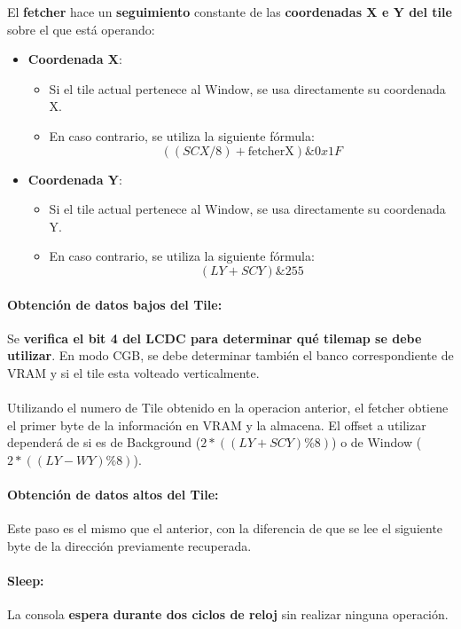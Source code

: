 El \textbf{fetcher} hace un \textbf{seguimiento} constante de las \textbf{coordenadas X e Y del tile} sobre el que está operando:

\begin{itemize}
    \item \textbf{Coordenada X}:
    \begin{itemize}
        \item Si el tile actual pertenece al Window, se usa directamente su coordenada X.
        \item En caso contrario, se utiliza la siguiente fórmula:
        \[
            ((SCX / 8) + \text{fetcherX}) \& 0x1F
        \]
    \end{itemize}
    \item \textbf{Coordenada Y}:
    \begin{itemize}
        \item Si el tile actual pertenece al Window, se usa directamente su coordenada Y.
        \item En caso contrario, se utiliza la siguiente fórmula:
        \[
            (LY + SCY) \& 255
        \]
    \end{itemize}
\end{itemize}

\paragraph{Obtención de datos bajos del Tile:} Se \textbf{verifica el bit 4 del LCDC para determinar qué tilemap se debe utilizar}. En modo CGB, se debe determinar también el banco correspondiente de VRAM y si el tile esta volteado verticalmente.
\\\\
Utilizando el numero de Tile obtenido en la operacion anterior, el fetcher obtiene el primer byte de la información en VRAM y la almacena. El offset a utilizar dependerá de si es de Background ($2*((LY + SCY) \% 8)$) o de Window ($2*((LY - WY) \% 8)$).

\paragraph{Obtención de datos altos del Tile:} Este paso es el mismo que el anterior, con la diferencia de que se lee el siguiente byte de la dirección previamente recuperada.

\paragraph{Sleep:} La consola \textbf{espera durante dos ciclos de reloj} sin realizar ninguna operación.


